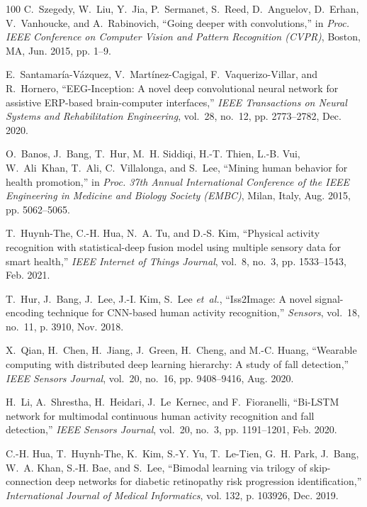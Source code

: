 \documentclass[journal]{IEEEtran}
\begin{document}
\begin{thebibliography}{100}
	C.~Szegedy, W.~Liu, Y.~Jia, P.~Sermanet, S.~Reed, D.~Anguelov, D.~Erhan,
	V.~Vanhoucke, and A.~Rabinovich, ``Going deeper with convolutions,'' in
	\emph{Proc. IEEE Conference on Computer Vision and Pattern Recognition
		(CVPR)}, Boston, MA, Jun. 2015, pp. 1--9.
	
	E.~Santamaría-Vázquez, V.~Martínez-Cagigal, F.~Vaquerizo-Villar, and
	R.~Hornero, ``{EEG-Inception}: A novel deep convolutional neural network for
	assistive {ERP}-based brain-computer interfaces,'' \emph{IEEE Transactions on
		Neural Systems and Rehabilitation Engineering}, vol.~28, no.~12, pp.
	2773--2782, Dec. 2020.
	
	O.~Banos, J.~Bang, T.~Hur, M.~H. Siddiqi, H.-T. Thien, L.-B. Vui, W.~Ali~Khan,
	T.~Ali, C.~Villalonga, and S.~Lee, ``Mining human behavior for health
	promotion,'' in \emph{Proc. 37th Annual International Conference of the IEEE
		Engineering in Medicine and Biology Society (EMBC)}, Milan, Italy, Aug. 2015,
	pp. 5062--5065.
	
	T.~Huynh-The, C.-H. Hua, N.~A. Tu, and D.-S. Kim, ``Physical activity
	recognition with statistical-deep fusion model using multiple sensory data
	for smart health,'' \emph{IEEE Internet of Things Journal}, vol.~8, no.~3,
	pp. 1533--1543, Feb. 2021.
	
	T.~Hur, J.~Bang, J.~Lee, J.-I. Kim, S.~Lee \emph{et~al.}, ``{Iss2Image}: A
	novel signal-encoding technique for {CNN}-based human activity recognition,''
	\emph{Sensors}, vol.~18, no.~11, p. 3910, Nov. 2018.
	
	X.~Qian, H.~Chen, H.~Jiang, J.~Green, H.~Cheng, and M.-C. Huang, ``Wearable
	computing with distributed deep learning hierarchy: A study of fall
	detection,'' \emph{IEEE Sensors Journal}, vol.~20, no.~16, pp. 9408--9416,
	Aug. 2020.
	
	H.~Li, A.~Shrestha, H.~Heidari, J.~Le~Kernec, and F.~Fioranelli, ``{Bi-LSTM}
	network for multimodal continuous human activity recognition and fall
	detection,'' \emph{IEEE Sensors Journal}, vol.~20, no.~3, pp. 1191--1201,
	Feb. 2020.
	
	C.-H. Hua, T.~Huynh-The, K.~Kim, S.-Y. Yu, T.~Le-Tien, G.~H. Park, J.~Bang,
	W.~A. Khan, S.-H. Bae, and S.~Lee, ``Bimodal learning via trilogy of
	skip-connection deep networks for diabetic retinopathy risk progression
	identification,'' \emph{International Journal of Medical Informatics}, vol.
	132, p. 103926, Dec. 2019.
	

\end{thebibliography}
\end{document}
